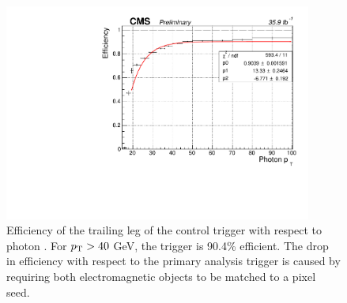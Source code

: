 \begin{figure}[h]
\begin{center}
\includegraphics[width=0.9\textwidth]{Figures/Trigger/controlTrailingEff.pdf}
\end{center}
\caption[Efficiency of the trailing leg of the control trigger with respect to photon \pT.]
{Efficiency of the trailing leg of the control trigger with respect to photon \pT. 
For $p_{\mathrm{T}} > 40$ GeV, the trigger is 90.4\% efficient. The drop in efficiency with respect to the primary analysis 
trigger is caused by requiring both electromagnetic objects to be matched to a pixel seed.}
\label{fig:controlTrailEff}
\end{figure}

